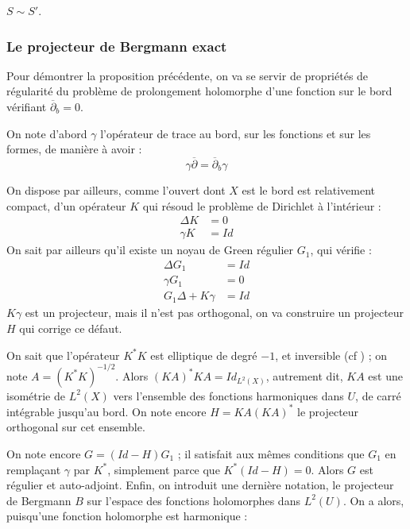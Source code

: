 \begin{prop}
  $S \sim S'$.
\end{prop}

\subsubsection{Le projecteur de Bergmann exact}
Pour démontrer la proposition précédente, on va se servir de propriétés de régularité du problème de prolongement holomorphe d'une fonction sur le bord vérifiant $\overline{\partial}_b =0$.

On note d'abord $\gamma$ l'opérateur de trace au bord, sur les fonctions et sur les formes, de manière à avoir :
\begin{equation*}
  \gamma \overline{\partial} = \overline{\partial}_b\gamma
\end{equation*}

\noindent On dispose par ailleurs, comme l'ouvert dont $X$ est le bord est relativement compact, d'un opérateur $K$ qui résoud le problème de Dirichlet à l'intérieur :
\begin{align*}
  \Delta K &= 0\\
  \gamma K &= Id
\end{align*}
On sait par ailleurs qu'il existe un noyau de Green régulier $G_1$, qui vérifie :
\begin{align*}
  \Delta G_1 &= Id\\
  \gamma G_1 &= 0\\
  G_1\Delta  + K\gamma &= Id
\end{align*}
$K\gamma$ est un projecteur, mais il n'est pas orthogonal, on va construire un projecteur $H$ qui corrige ce défaut.

On sait que l'opérateur $K^*K$ est elliptique de degré $-1$, et inversible (cf \cite{krantz1992partial}) ; on note $A=(K^*K)^{-1/2}$. Alors $(KA)^*KA = Id_{L^2(X)}$, autrement dit, $KA$ est une isométrie de $L^2(X)$ vers l'ensemble des fonctions harmoniques dans $U$, de carré intégrable jusqu'au bord. On note encore $H=KA(KA)^*$ le projecteur orthogonal sur cet ensemble.

On note encore $G=(Id-H)G_1$ ; il satisfait aux mêmes conditions que $G_1$ en remplaçant $\gamma$ par $K^*$, simplement parce que $K^*(Id-H) = 0$. Alors $G$ est régulier et auto-adjoint. Enfin, on introduit une dernière notation, le projecteur de Bergmann $B$ sur l'espace des fonctions holomorphes dans $L^2(U)$. On a alors, puisqu'une fonction holomorphe est harmonique :


